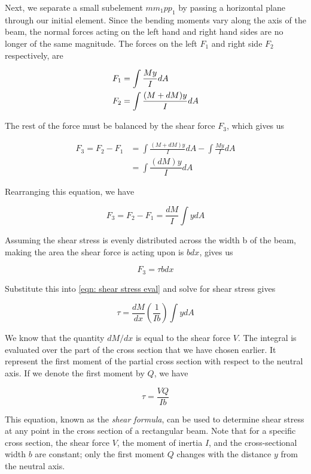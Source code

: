\documentclass[
fontsize=10pt,
a4paper,
twosides=false,
open=any,
svgnames,
]{kaobook} %
\begin{document}
Next, we separate a small subelement $mm_1pp_1$ by passing a horizontal plane through our initial element. Since the bending moments vary along the axis of the beam, the normal forces acting on the left hand and right hand sides are no longer of the same magnitude. The forces on the left $F_1$ and right side $F_2$ respectively, are

\[\begin{gathered}
    F_1 = \int \frac{My}{I}dA \hfill \\
    F_2 = \int \frac{(M + dM)y}{I}dA \hfill \\ 
  \end{gathered} \]

The rest of the force must be balanced by the shear force $F_3$, which gives us

\begin{align*}
  F_3 = F_2 - F_1 &= \int \frac{(M + dM)y}{I}dA  - \int \frac{My}{I}dA  \\ 
                        &= \int \dfrac{(dM)y}{I}dA 
 \end{align*}

 Rearranging this equation, we have

\begin{equation} \label{eqn: shear stress eval}
  F_3 = F_2 - F_1 = \frac{dM}{I}\int y dA
\end{equation}

Assuming the shear stress is evenly distributed across the width b of the beam, making the area the shear force is acting upon is $bdx$, gives us

\[F_3 = \tau bdx\]

Substitute this into \cref{eqn: shear stress eval} and solve for shear stress gives

\[\tau  = \frac{dM}{dx}\left( {\frac{1}{Ib}} \right) \int ydA \]

We know that the quantity $dM/dx$ is equal to the shear force $V$. The integral is evaluated over the part of the cross section that we have chosen earlier. It represent the first moment of the partial cross section with respect to the neutral axis. If we denote the first moment by $Q$, we have

\begin{equation}
  \tau  = \frac{VQ}{Ib}
\end{equation}

This equation, known as the \emph{shear formula}, can be used to determine shear stress at any point in the cross section of a rectangular beam. Note that for a specific cross section, the shear force $V$, the moment of inertia $I$, and the cross-sectional width $b$ are constant; only the first moment $Q$ changes with the distance $y$ from the neutral axis.
\end{document}
